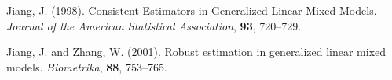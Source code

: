 \documentclass{article}\usepackage{graphicx, color}
\begin{document}
\begin{thebibliography}{}

Jiang, J. (1998).
\newblock Consistent Estimators in Generalized Linear Mixed Models.
\newblock \emph{Journal of the American Statistical Association}, \textbf{93}, 720--729.

Jiang, J. and Zhang, W. (2001).
\newblock Robust estimation in generalized linear mixed models.
\newblock \emph{Biometrika}, \textbf{88}, 753--765.

\end{thebibliography}
\end{document}
